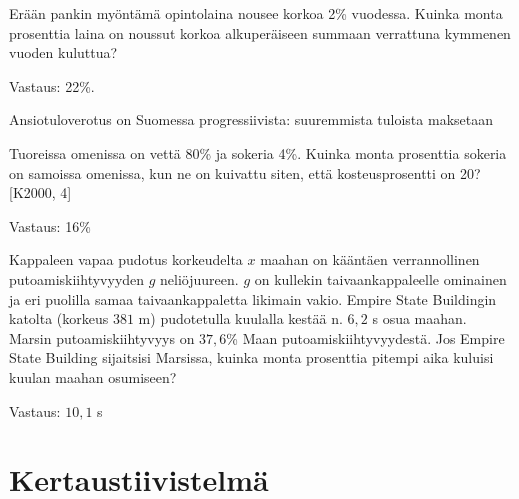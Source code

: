 \begin{tehtava}
    Erään pankin myöntämä opintolaina nousee korkoa 2\% vuodessa. Kuinka monta prosenttia laina on noussut korkoa alkuperäiseen 
    summaan verrattuna kymmenen vuoden kuluttua?

    \begin{vastaus}
        Vastaus: 22\%.
    \end{vastaus}
\end{tehtava}

Ansiotuloverotus on Suomessa progressiivista: suuremmista tuloista maksetaan

\begin{tehtava}
    Tuoreissa omenissa on vettä 80\% ja sokeria 4\%. Kuinka monta prosenttia sokeria on samoissa omenissa, kun ne on kuivattu siten, 
    että kosteusprosentti on 20? [K2000, 4]
    
    \begin{vastaus}
        Vastaus: 16\%
    \end{vastaus}
\end{tehtava}

\begin{tehtava}
    Kappaleen vapaa pudotus korkeudelta $x$ maahan on kääntäen verrannollinen putoamiskiihtyvyyden $g$ neliöjuureen. $g$ on kullekin     
    taivaankappaleelle ominainen ja eri puolilla samaa taivaankappaletta likimain vakio. Empire State Buildingin katolta (korkeus 
    $381$ m) pudotetulla kuulalla kestää n. $6,2$ s osua maahan. Marsin putoamiskiihtyvyys on $37,6$\%  Maan putoamiskiihtyvyydestä. 
    Jos Empire State Building sijaitsisi Marsissa, kuinka monta prosenttia pitempi aika kuluisi kuulan maahan osumiseen?

    \begin{vastaus}
        Vastaus: $10,1$ s
    \end{vastaus}
\end{tehtava}

%
%
\chapter{Kertaustiivistelmä}
